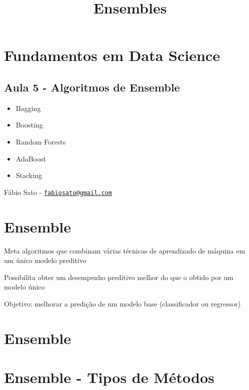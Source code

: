 \documentclass[11pt]{article}
\title{Ensembles}
\providecommand{\tightlist}{%
      \setlength{\itemsep}{0pt}\setlength{\parskip}{0pt}}
\begin{document}
    
    
    \maketitle
    
    

    
    \hypertarget{fundamentos-em-data-science}{%
\section{Fundamentos em Data
Science}\label{fundamentos-em-data-science}}

\hypertarget{aula-5---algoritmos-de-ensemble}{%
\subsection{Aula 5 - Algoritmos de
Ensemble}\label{aula-5---algoritmos-de-ensemble}}

\begin{itemize}
\tightlist
\item
  Bagging
\item
  Boosting
\item
  Random Forests
\item
  AdaBoost
\item
  Stacking
\end{itemize}

Fábio Sato -
\href{mailto:fabiosato@gmail.com}{\nolinkurl{fabiosato@gmail.com}}

    \hypertarget{ensemble}{%
\section{Ensemble}\label{ensemble}}

Meta algoritmos que combinam várias técnicas de aprendizado de máquina
em um único modelo preditivo

Possibilita obter um desempenho preditivo melhor do que o obtido por um
modelo único

Objetivo: melhorar a predição de um modelo base (classificador ou
regressor)

    \hypertarget{ensemble}{%
\section{Ensemble}\label{ensemble}}

    \hypertarget{ensemble---tipos-de-muxe9todos}{%
\section{Ensemble - Tipos de
Métodos}\label{ensemble---tipos-de-muxe9todos}}
\end{document}
